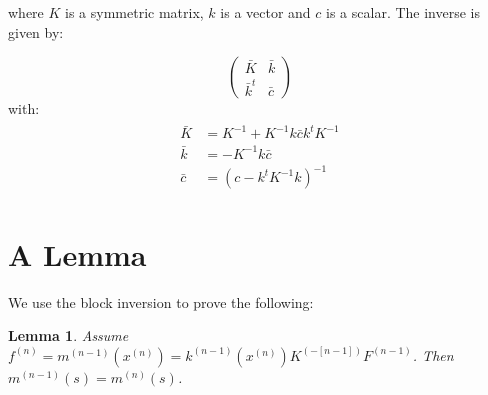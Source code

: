 \documentclass[paper=a4, fontsize=11pt]{scrartcl} %
\newtheorem{lemma}[theorem]{Lemma}
\numberwithin{equation}{section} %
\numberwithin{figure}{section} %
\numberwithin{table}{section} %
\newcommand{\xn}{x^{(n)}} %
\newcommand{\mn}{m^{(n)}}
\newcommand{\mnm}{m^{(n-1)}}
\newcommand{\fn}{f^{(n)}} %
\newcommand{\Fnm}{F^{(n-1)}}
\newcommand{\knm}{k^{(n-1)}}
\newcommand{\Kinv}{K^{-1}} %
\begin{document}
where $K$ is a symmetric matrix, $k$ is a vector and $c$ is a scalar.
The inverse is given by:

$$ \left( \begin{array}{cc}
\bar{K}   &  \bar{k} \\
\bar{k}^t   &  \bar{c} \end{array} \right)
$$
with:
\begin{align}
 \begin{split}
\bar{K} &=  \Kinv + K^{-1}k\bar{c}k^t\Kinv\\
\bar{k} &=  -\Kinv k\bar{c}\\
\bar{c} &= (c - k^t\Kinv k)^{-1} 
 \end{split}
\end{align}

\section{A Lemma}
We use the block inversion to prove the following:
\begin{lemma}
Assume $\fn = \mnm(\xn) =  \knm(\xn)K^{(-[n-1])}\Fnm$. Then $\mnm(s) = \mn(s)$.
\end{lemma}
\end{document}
